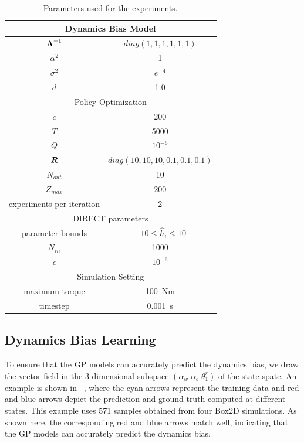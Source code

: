 \begin{table}
\begin{center}
\caption{Parameters used for the experiments.} \label{tab:learning_parameters}
\begin{tabular}{c|c}
\hline
\multicolumn{2}{c}{Dynamics Bias Model}\\\hline
$\mbox{\boldmath \(\Lambda\)}^{-1}$ & $diag(1, 1, 1, 1, 1, 1)$\\
$\alpha^2$ & 1\\
$\sigma^2$ & $e^{-4}$\\
$d$ & 1.0\\\hline
\multicolumn{2}{c}{Policy Optimization}\\\hline
$c$ & 200\\
$T$ & 5000\\
$Q$ & $10^{-6}$\\
$\mbox{\boldmath \(R\)}$ & $diag(10, 10, 10, 0.1, 0.1, 0.1)$\\
$N_{out}$ & 10\\
$Z_{max}$ & 200\\
experiments per iteration & 2\\\hline
\multicolumn{2}{c}{DIRECT parameters}\\\hline
parameter bounds & $-10 \leq \hat{h}_i \leq 10$\\
$N_{in}$ & 1000\\
$\epsilon$ & $10^{-6}$\\\hline
\multicolumn{2}{c}{Simulation Setting}\\\hline
maximum torque & 100~Nm\\
timestep & 0.001~s\\
\hline
\end{tabular}
\end{center}
\end{table}

\subsection{Dynamics Bias Learning}

To ensure that the GP models can accurately predict the dynamics bias, we
draw the vector field in the 3-dimensional subspace 
$(\alpha_w\;\alpha_b\;\theta_1^r)$ of the state spate.
An example is shown in ~, where 
the cyan arrows represent the training data and 
red and blue arrows depict the prediction and ground truth computed
at different states.
This example uses 571 samples obtained from four Box2D simulations.
As shown here, the corresponding red and blue arrows match well,
indicating that the GP models can accurately predict the dynamics bias.

